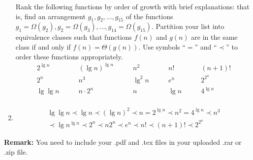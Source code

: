 \documentclass[12pt,a4paper]{article}
\makeatletter
\newtheorem*{solution}{Solution}
\theoremstyle{definition}
\renewenvironment{solution}[1][Solution] {\par\pushQED{\qed}\normalfont\topsep6\p@\@plus6\p@\relax\trivlist\item[\hskip\labelsep\bfseries#1\@addpunct{.}]\ignorespaces}{\popQED\endtrivlist\@endpefalse} \makeatother
\makeatother
\begin{document}
\begin{enumerate}
    Rank the following functions by order of growth with brief explanations: that is, find an arrangement $g_1, g_2, \ldots , g_{15}$ of the functions $g_1 = \Omega(g_2), g_2 = \Omega(g_3), \ldots, g_{14} = \Omega(g_{15})$.  Partition your list into equivalence classes such that functions $f(n)$ and $g(n)$ are in the same class if and only if $f(n) = \Theta(g(n))$. Use symbols ``$=$'' and ``$\prec$'' to order these functions appropriately.
    $$
    \begin{array}{ccccc}
        2^{\lg n} \quad & \quad (\lg n)^{\lg n} \quad & \quad n^2 \quad & \quad n! \quad & \quad (n + 1)! \\
        2^n \quad & \quad n^3 \quad & \quad \lg^2 n \quad & \quad e^n \quad & \quad 2^{2^n} \\
        \lg\lg n \quad & \quad n\cdot 2^n \quad & \quad n \quad & \quad \lg n \quad & \quad 4^{\lg n} \\
    \end{array}
    $$


    \begin{solution}
        \begin{align*}
           \lg\lg{n} \prec \lg n \prec (\lg n)^2 \prec n = 2^{\lg n} \prec n^2 = 4^{\lg n} \prec n^3 \\
            \prec \lg n^{\lg n} \prec 2^n \prec n2^n \prec e^n  \prec n! \prec (n + 1)! \prec 2^{2^n}
        \end{align*}
    
        \end{solution}


\end{enumerate}

\vspace{20pt}

\textbf{Remark:} You need to include your .pdf and .tex files in your uploaded .rar or .zip file.

\end{document}
